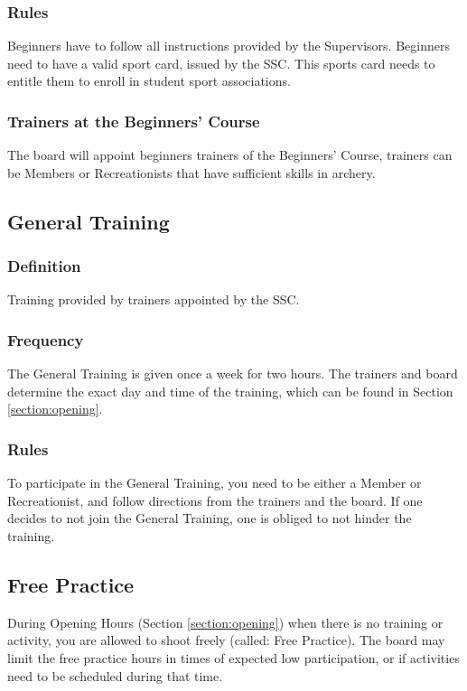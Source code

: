 \documentclass[a4paper]{article}
\begin{document}
\subsubsection{Rules}
Beginners have to follow all instructions provided by the Supervisors. Beginners need to have a valid sport card, issued by the SSC. This sports card needs to entitle them to enroll in student sport associations.

\subsubsection{Trainers at the Beginners' Course}
The board will appoint beginners trainers of the Beginners' Course, trainers can be Members or Recreationists that have sufficient skills in archery.

\subsection{General Training}
\subsubsection{Definition}
Training provided by trainers appointed by the SSC.

\subsubsection{Frequency}
The General Training is given once a week for two hours. The trainers and board determine the exact day and time of the training, which can be found in Section \ref{section:opening}.

\subsubsection{Rules}
To participate in the General Training, you need to be either a Member or Recreationist, and follow directions from the trainers and the board. If one decides to not join the General Training, one is obliged to not hinder the training. 

\subsection{Free Practice}
During Opening Hours (Section \ref{section:opening}) when there is no training or activity, you are allowed to shoot freely (called: Free Practice). The board may limit the free practice hours in times of expected low participation, or if activities need to be scheduled during that time. \\
\end{document}

